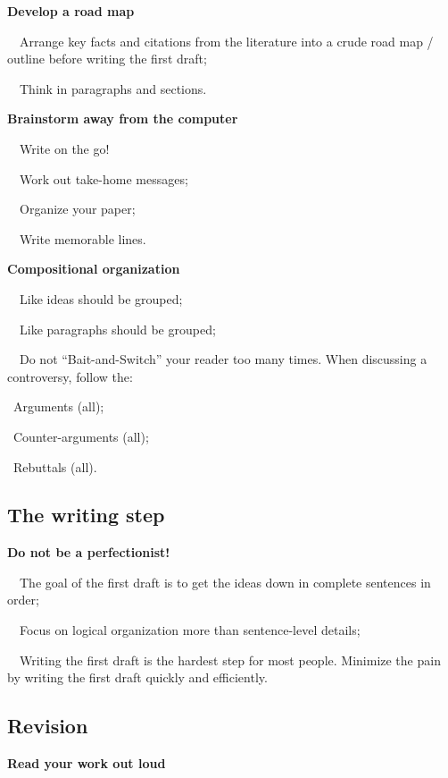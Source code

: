 \documentclass[a4paper, 12pt]{article}
\begin{document}
\textbf{Develop a road map}
\par\ \textbullet\ Arrange key facts and citations from the literature into a crude road map / outline before writing the first draft;
\par\ \textbullet\ Think in paragraphs and sections.

\textbf{Brainstorm away from the computer}
\par\ \textbullet\ Write on the go!
\par\ \textbullet\ Work out take-home messages;
\par\ \textbullet\ Organize your paper;
\par\ \textbullet\ Write memorable lines.
  
\textbf{Compositional organization}
\par\ \textbullet\ Like ideas should be grouped;
\par\ \textbullet\ Like paragraphs should be grouped;
\par\ \textbullet\ Do not ``Bait-and-Switch'' your reader too many times. When discussing a controversy, follow the:
\par\quad\textopenbullet\ Arguments (all);
\par\quad\textopenbullet\ Counter-arguments (all);
\par\quad\textopenbullet\ Rebuttals (all).

\newpage\subsection{The writing step}

\textbf{Do not be a perfectionist!}

\par\ \textbullet\ The goal of the first draft is to get the ideas down in complete sentences in order;

\par\ \textbullet\ Focus on logical organization more than sentence-level details;

\par\ \textbullet\ Writing the first draft is the hardest step for most people. Minimize the pain by writing the first draft quickly and efficiently.

\subsection{Revision}

\textbf{Read your work out loud}
\end{document}
